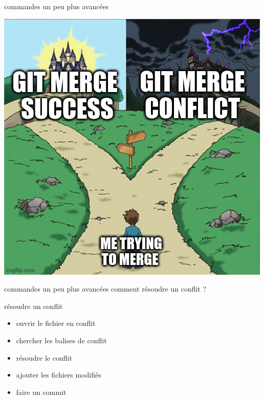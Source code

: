 \documentclass[usenames,dvipsnames]{beamer}
\begin{document}
\begin{frame}[fragile]{commandes un peu plus avancées}
	\begin{center}
		\includegraphics[width=0.7\linewidth]{Im/merge_outcome.jpg}
	\end{center}
\end{frame}

\begin{frame}[fragile]{commandes un peu plus avancées}
	comment résoudre un conflit ?
	\begin{blueblock}{résoudre un conflit}
		\begin{itemize}
			\item ouvrir le fichier en conflit
			\item chercher les balises de conflit
			\item résoudre le conflit
			\item ajouter les fichiers modifiés
			\item faire un commit
		\end{itemize}
	\end{blueblock}
\end{frame}
\end{document}
